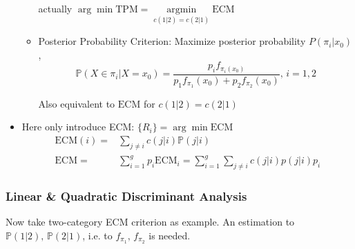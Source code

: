 \begin{itemize}[topsep=2pt,itemsep=2pt]
\begin{itemize}[topsep=2pt,itemsep=2pt]
    actually $ \arg\min\mathrm{TPM}=\mathop{\arg\min}\limits_{c(1|2)=c(2|1)} \mathrm{ECM} $
    \item Posterior Probability Criterion: Maximize posterior probability $ P(\pi_i|x_0) $,
    \begin{equation}
        \mathbb{P}(X\in\pi_i|X=x_0)=\dfrac{p_i f_{\pi_i(x_0)}}{p_1f_{\pi_1}(x_0)+p_2f_{\pi_2}(x_0)},\, i=1,2
    \end{equation}
    
    Also equivalent to $ \mathrm{ECM} $ for $ c(1|2)=c(2|1) $
\end{itemize}
    \item Here only introduce ECM: $ \{R_i\}=\arg\min\mathrm{ECM} $
    \begin{align*}
        \mathrm{ECM}(i)=&\sum_{j\neq i}c(j|i)\mathbb{P}(j|i)\\
        \mathrm{ECM}=&\sum_{i=1}^gp_i\mathrm{ECM}_i=\sum_{i=1}^g\sum_{j\neq i} c(j|i)p(j|i)p_i
    \end{align*}
\end{itemize}

    
    




    
\subsubsection{Linear \& Quadratic Discriminant Analysis}
    Now take two-category ECM criterion as example. An estimation to $ \mathbb{P}(1|2),\,\mathbb{P}(2|1) $, i.e. to $ f_{\pi_1},\,f_{\pi_2} $ is needed.

